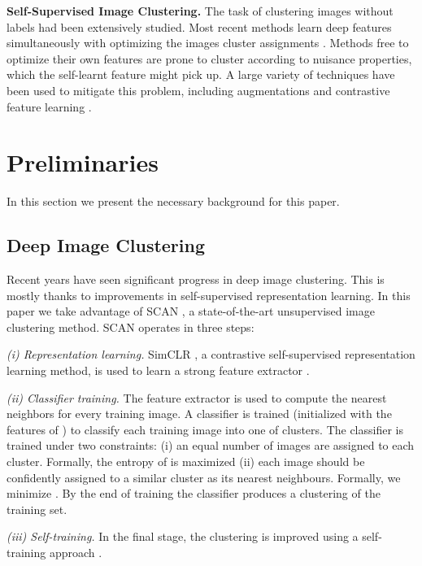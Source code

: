 \documentclass[runningheads]{llncs}
\begin{document}
\noindent\textbf{Self-Supervised Image Clustering.} The task of clustering images without labels had been extensively studied. Most recent methods learn deep features simultaneously with optimizing the images cluster assignments \cite{caron2018deep}. Methods free to optimize their own features are prone to cluster according to nuisance properties, which the self-learnt feature might pick up.  A large variety of techniques have been used to mitigate this problem, including augmentations \cite{ji2019invariant} and contrastive feature learning \cite{van2020scan}.


\section{Preliminaries}
\label{sec:preliminaries}

In this section we present the necessary background for this paper.


\subsection{Deep Image Clustering}
\label{subsec:background:scan}

Recent years have seen significant progress in deep image clustering. This is mostly thanks to improvements in self-supervised representation learning. In this paper we take advantage of SCAN \cite{van2020scan}, a state-of-the-art unsupervised image clustering method. SCAN operates in three steps: 

\noindent \textit{(i) Representation learning.} SimCLR \cite{chen2020simple}, a contrastive self-supervised representation learning method, is used to learn a strong feature extractor . 

\noindent \textit{(ii) Classifier training.} The feature extractor  is used to compute the nearest neighbors for every training image. A classifier  is trained (initialized with the features of ) to classify each training image  into one of  clusters. The classifier  is trained under two constraints: (i) an equal number of images are assigned to each cluster. Formally, the entropy of  is maximized (ii) each image should be confidently assigned to a similar cluster as its nearest neighbours. Formally, we minimize . By the end of training the classifier produces a clustering of the training set. 

\noindent \textit{(iii) Self-training.} In the final stage, the clustering is improved using a self-training approach \cite{mclachlan1975iterative}. 
\end{document}
